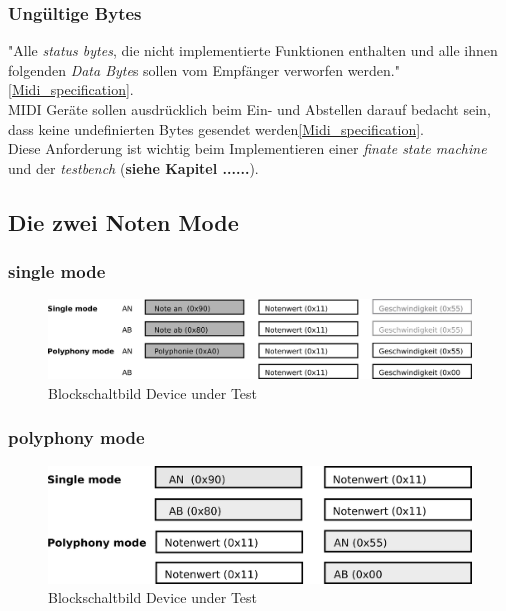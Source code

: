\subsubsection*{Ungültige Bytes}
"Alle \textit{status bytes}, die nicht implementierte Funktionen enthalten und alle ihnen folgenden \textit{Data Byte}s sollen vom Empfänger verworfen werden."\ref{Midi_specification}.\\ MIDI Geräte sollen ausdrücklich beim Ein- und Abstellen darauf bedacht sein, dass keine undefinierten Bytes gesendet werden\ref{Midi_specification}.\\
Diese Anforderung ist wichtig beim Implementieren einer \textit{finate state machine} und der \textit{testbench} (\textbf{siehe Kapitel ......}). \\

\subsection{Die zwei Noten Mode}
\subsubsection*{single mode}
\begin{figure}[H]
	\centering
	\includegraphics[width=1\textwidth]{images/midi_interface/MIDI_Spezifikation.png}
	\caption{Blockschaltbild Device under Test}
	\label{fig.testbench_single_Mode}
\end{figure}
\subsubsection*{polyphony mode}
\begin{figure}[H]
	\centering
	\includegraphics[width=1\textwidth]{images/midi_interface/MIDI_Spezifikation_Datenfolge.png}
	\caption{Blockschaltbild Device under Test}
	\label{fig.testbench_polypphon_mode}
\end{figure}


